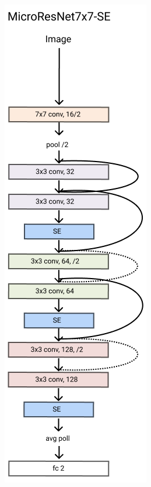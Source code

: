 \documentclass[../document.tex]{subfiles}
\begin{document}
\begin{figure}[htbp]
\begin{subfigure}[b]{0.22\textwidth}
    \end{subfigure}
    \begin{subfigure}[b]{0.22\textwidth}
        \includegraphics[width=\textwidth]{../img/3/models/transparent-microresnet7x7-se.png}

\end{subfigure}
\end{figure}
\end{document}
